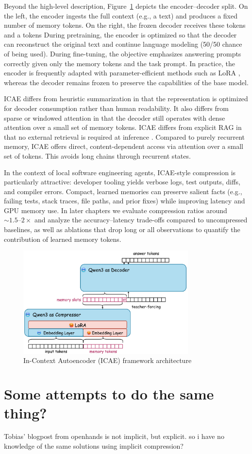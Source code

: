 Beyond the high-level description, Figure~\ref{fig:icae} depicts the encoder–decoder split. 
On the left, the encoder ingests the full context (e.g., a text) and produces a fixed number of memory tokens. 
On the right, the frozen decoder receives these tokens and a tokens
During pretraining, the encoder is optimized so that the decoder can reconstruct the original text and continue language modeling (50/50 chance of being used).
During fine-tuning, the objective emphasizes answering prompts correctly given only the memory tokens and the task prompt.
In practice, the encoder is frequently adapted with parameter-efficient methods such as LoRA \cite{hu2021lora}, whereas the decoder remains frozen to preserve the capabilities of the base model.

ICAE differs from heuristic summarization in that the representation is optimized for decoder consumption rather than human readability.
It also differs from sparse or windowed attention in that the decoder still operates with dense attention over a small set of memory tokens.
ICAE differs from explicit RAG in that no external retrieval is required at inference \cite{beltagy_longformer_2020,zaheer_bigbird_2020,lewis_rag_2020}.
Compared to purely recurrent memory, ICAE offers direct, content-dependent access via attention over a small set of tokens.
This avoids long chains through recurrent states.

In the context of local software engineering agents, ICAE-style compression is particularly attractive: developer tooling yields verbose logs, test outputs, diffs, and compiler errors.
Compact, learned memories can preserve salient facts (e.g., failing tests, stack traces, file paths, and prior fixes) while improving latency and GPU memory use.
In later chapters we evaluate compression ratios around \(\sim\!1.5\text{--}2\times\) and analyze the accuracy–latency trade-offs compared to uncompressed baselines, as well as ablations that drop long or all observations to quantify the contribution of learned memory tokens.


\begin{figure}[hbt]
  \centering
  \includegraphics[width=0.8\textwidth]{graphs/icae.jpeg}
  \caption{In-Context Autoencoder (ICAE) framework architecture}
  \label{fig:icae}
\end{figure}


\section{Some attempts to do the same thing?}

Tobias' blogpost from openhands is not implicit, but explicit. so i have no knowledge of the same solutions using implicit compression?